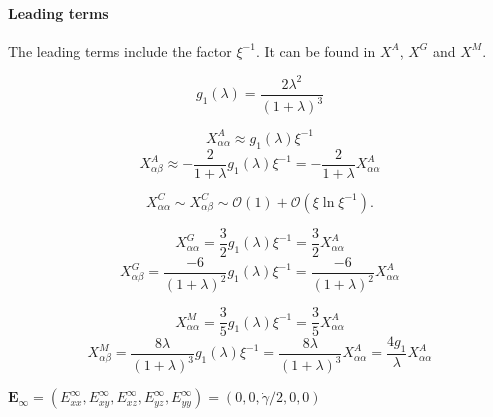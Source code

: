 \documentclass[12pt]{article}
\begin{document}
\paragraph{Leading terms}

The leading terms include the factor $\xi^{-1}$.
%
It can be found in $X^{A}$, $X^{G}$ and $X^{M}$.
%



\begin{equation*}
 g_1 (\lambda)
= \frac{2\lambda^2}{(1+\lambda)^3}
\end{equation*}

\begin{equation*}
 X_{\alpha\alpha}^{A}
\approx 
g_1(\lambda) \xi^{-1}
\end{equation*}
\begin{equation*}
 X_{\alpha\beta}^{A}
\approx
-\frac{2}{1+\lambda}g_1(\lambda) \xi^{-1}
 = 
-\frac{2}{1+\lambda} X_{\alpha\alpha}^{A} 
\end{equation*}

\begin{equation*}
 X_{\alpha\alpha}^{C} 
\sim
 X_{\alpha\beta}^{C}
\sim
\mathcal{O}(1) + \mathcal{O}(\xi \ln \xi^{-1}).
\end{equation*}

\begin{equation*}
 X_{\alpha\alpha}^{G}
= \frac{3}{2}g_1(\lambda) \xi^{-1}
= \frac{3}{2} X_{\alpha\alpha}^{A} 
\end{equation*}
\begin{equation*}
 X_{\alpha \beta}^{G}
=
\frac{-6}{(1+\lambda)^2}
g_1 (\lambda) \xi^{-1}
= 
\frac{-6}{(1+\lambda)^2} X_{\alpha\alpha}^{A}
\end{equation*}

\begin{equation*}
 X_{\alpha \alpha}^{M}
=
\frac{3}{5} g_1(\lambda) \xi^{-1}
= \frac{3}{5} X_{\alpha\alpha}^{A}
\end{equation*}
\begin{equation}
 X_{\alpha \beta}^{M}
=
\frac{8\lambda}{(1+\lambda)^3} g_1(\lambda) \xi^{-1}
= 
\frac{8\lambda}{(1+\lambda)^3} X_{\alpha\alpha}^{A}
= 
\frac{4g_1}{\lambda} X_{\alpha\alpha}^{A}
\end{equation}


\newpage

$\bm{E}_{\infty} = 
(E_{xx}^{\infty},
E_{xy}^{\infty},
E_{xz}^{\infty},
E_{yz}^{\infty},
E_{yy}^{\infty}
)
=
(0, 0, \dot{\gamma}/2, 0, 0) $
\end{document}
